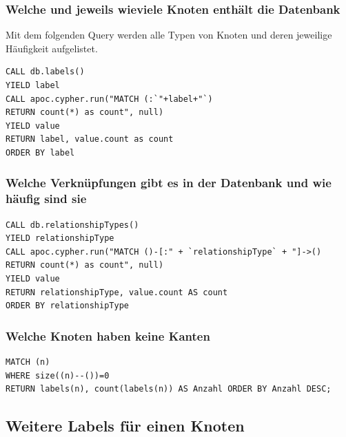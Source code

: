 \hypertarget{welche-und-jeweils-wieviele-knoten-enthuxe4lt-die-datenbank}{%
\subsubsection{Welche und jeweils wieviele Knoten enthält die
Datenbank}\label{welche-und-jeweils-wieviele-knoten-enthuxe4lt-die-datenbank}}

Mit dem folgenden Query werden alle Typen von Knoten und deren jeweilige
Häufigkeit aufgelistet.

\begin{verbatim}
CALL db.labels()
YIELD label
CALL apoc.cypher.run("MATCH (:`"+label+"`)
RETURN count(*) as count", null)
YIELD value
RETURN label, value.count as count
ORDER BY label
\end{verbatim}

\hypertarget{welche-verknuxfcpfungen-gibt-es-in-der-datenbank-und-wie-huxe4ufig-sind-sie}{%
\subsubsection{Welche Verknüpfungen gibt es in der Datenbank und wie
häufig sind
sie}\label{welche-verknuxfcpfungen-gibt-es-in-der-datenbank-und-wie-huxe4ufig-sind-sie}}

\begin{verbatim}
CALL db.relationshipTypes()
YIELD relationshipType
CALL apoc.cypher.run("MATCH ()-[:" + `relationshipType` + "]->()
RETURN count(*) as count", null)
YIELD value
RETURN relationshipType, value.count AS count
ORDER BY relationshipType
\end{verbatim}

\hypertarget{welche-knoten-haben-keine-kanten}{%
\subsubsection{Welche Knoten haben keine
Kanten}\label{welche-knoten-haben-keine-kanten}}

\begin{verbatim}
MATCH (n)
WHERE size((n)--())=0
RETURN labels(n), count(labels(n)) AS Anzahl ORDER BY Anzahl DESC;
\end{verbatim}

\hypertarget{weitere-labels-fuxfcr-einen-knoten}{%
\subsection{Weitere Labels für einen
Knoten}\label{weitere-labels-fuxfcr-einen-knoten}}


